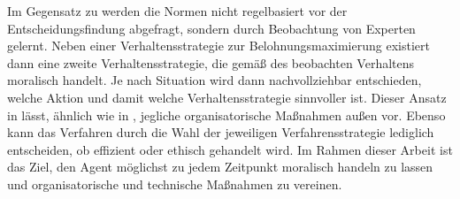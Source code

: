 Im Gegensatz zu \citeauthor{cointe} werden die Normen nicht regelbasiert vor der Entscheidungsfindung abgefragt, sondern durch Beobachtung von Experten gelernt.
Neben einer Verhaltensstrategie zur Belohnungsmaximierung existiert dann eine zweite Verhaltensstrategie, die gemäß des beobachten Verhaltens moralisch handelt.
Je nach Situation wird dann nachvollziehbar entschieden, welche Aktion und damit welche Verhaltensstrategie sinnvoller ist.
Dieser Ansatz in \cite{noothigattu} lässt, ähnlich wie in \cite{cointe}, jegliche organisatorische Maßnahmen außen vor.
Ebenso kann das Verfahren durch die Wahl der jeweiligen Verfahrensstrategie lediglich entscheiden, ob effizient oder ethisch gehandelt wird.
Im Rahmen dieser Arbeit ist das Ziel, den Agent möglichst zu jedem Zeitpunkt moralisch handeln zu lassen und organisatorische und technische Maßnahmen zu vereinen.